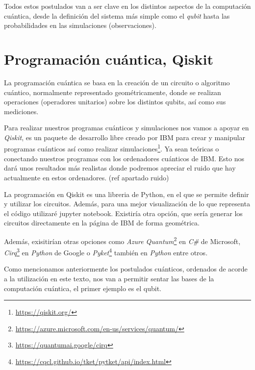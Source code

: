 Todos estos postulados van a ser clave en los distintos aspectos de la computación cuántica, desde la definición del sistema más simple como el \textit{qubit} hasta las probabilidades en las simulaciones (observaciones).

\vspace{15pt}
\section{Programación cuántica, Qiskit}
\label{Sec2.3:Qiskit}

 La programación cuántica se basa en la creación de un circuito o algoritmo cuántico, normalmente representado geométricamente, donde se realizan operaciones (operadores unitarios) sobre los distintos qubits, así como sus mediciones\cite{B:QuantumScientist:2008}.\newline

 Para realizar nuestros programas cuánticos y simulaciones nos vamos a apoyar en \textit{Qiskit}, es un paquete de desarrollo libre creado por IBM para crear y manipular programas cuánticos así como realizar simulaciones\footnote{\url{https://qiskit.org/}}. Ya sean teóricas o conectando nuestros programas con los ordenadores cuánticos de IBM. Esto nos dará unos resultados más realistas donde podremos apreciar el ruido que hay actualmente en estos ordenadores. (ref apartado ruido) \newline
 
 La programación en Qiskit es una libreria de Python, en el que se permite definir y utilizar los circuitos. Además, para una mejor visualización de lo que representa el código utilizaré jupyter notebook. Existiría otra opción, que sería generar los circuitos directamente en la página de IBM de forma geométrica\footnotemark[1].\newline

 Además, exisitirían otras opciones como \textit{Azure Quantum}\footnote{\url{https://azure.microsoft.com/en-us/services/quantum/}} en \textit{C\#} de Microsoft, \textit{Cirq}\footnote{\url{https://quantumai.google/cirq}} en \textit{Python} de Google o \textit{Pyket}\footnote{\url{https://cqcl.github.io/tket/pytket/api/index.html}} también en \textit{Python} entre otros. \newline
 
 Como mencionamos anteriormente los postulados cuánticos, ordenados de acorde a la utilización en este texto, nos van a permitir sentar las bases de la computación cuántica, el primer ejemplo es el qubit. \newline
 
